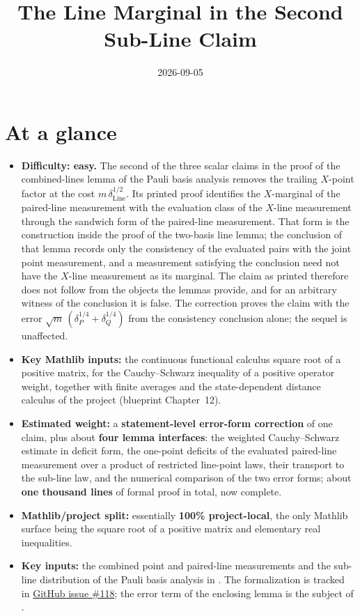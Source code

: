 \documentclass[11pt]{article}
\title{The Line Marginal in the Second Sub-Line Claim}
\author{}
\date{2026-09-05}
\renewcommand{\ghissue}[1]{%
  \href{https://github.com/Dengnifer/MIPStarRE-A/issues/#1}{GitHub issue \##1}}
\begin{document}
\maketitle

\section{At a glance}

\begin{itemize}
  \item \textbf{Difficulty: easy.}  The second of the three scalar claims
  in the proof of the combined-lines lemma of the Pauli basis analysis
  removes the trailing $X$-point factor at the cost
  $m\,\delta_{\mathrm{Line}}^{1/2}$.  Its printed proof identifies the
  $X$-marginal of the paired-line measurement with the evaluation class of
  the $X$-line measurement through the sandwich form of the paired-line
  measurement.  That form is the construction inside the proof of the
  two-basis line lemma; the conclusion of that lemma records only the
  consistency of the evaluated pairs with the joint point measurement, and
  a measurement satisfying the conclusion need not have the $X$-line
  measurement as its marginal.  The claim as printed therefore does not
  follow from the objects the lemmas provide, and for an arbitrary witness
  of the conclusion it is false.  The correction proves the claim with the
  error $\sqrt{m}\,(\delta_P^{1/4} + \delta_Q^{1/4})$ from the consistency
  conclusion alone; the sequel is unaffected.
  \item \textbf{Key Mathlib inputs:} the continuous functional calculus
  square root of a positive matrix, for the Cauchy--Schwarz inequality of a
  positive operator weight, together with finite averages and the
  state-dependent distance calculus of the project (blueprint
  Chapter~12).
  \item \textbf{Estimated weight:} a \textbf{statement-level error-form
  correction} of one claim, plus about \textbf{four lemma interfaces}: the
  weighted Cauchy--Schwarz estimate in deficit form, the one-point
  deficits of the evaluated paired-line measurement over a product of
  restricted line-point laws, their transport to the sub-line law, and
  the numerical comparison of the two error forms; about \textbf{one
  thousand lines} of formal proof in total, now complete.
  \item \textbf{Mathlib/project split:} essentially \textbf{100\%
  project-local}, the only Mathlib surface being the square root of a
  positive matrix and elementary real inequalities.
  \item \textbf{Key inputs:} the combined point and paired-line
  measurements and the sub-line distribution of the Pauli basis analysis
  in \cite{Ji2020MIPStar}.  The formalization is tracked in
  \ghissue{118}; the error term of the enclosing lemma is the subject of
  .
\end{itemize}
\end{document}

